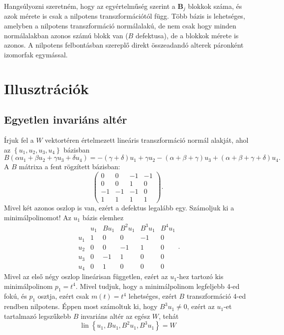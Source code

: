\documentclass[9pt, a4paper, showtrims]{memoir}
\theoremstyle{plain}
\theoremstyle{remark}
\theoremstyle{definition}
\DeclareMathOperator{\lin}{lin}
\begin{document}
Hangsúlyozni szeretném, hogy az egyértelműség szerint a $\mathbf{B}_j$ blokkok száma, és azok mérete is csak
a nilpotens transzformációtól függ.
Több bázis is lehetséges, amelyben a nilpotens transzformáció normálalakú,
de nem csak hogy minden normálalakban azonos számú blokk van ($B$ defektusa),
de a blokkok mérete is azonos.
A nilpotens felbontásban szereplő direkt összeadandó alterek páronként izomorfak egymással.
\section{Illusztrációk}
\subsection{Egyetlen invariáns altér}
Írjuk fel a $W$ vektortéren értelmezett lineáris transzformáció normál alakját,
ahol az $\left\{ u_1,u_2,u_3,u_4 \right\}$ bázisban
\[
	B\left( \alpha u_1+\beta u_2+\gamma u_3+\delta u_4 \right)=
	-\left( \gamma + \delta \right)u_1
	+\gamma u_2
	-\left( \alpha+\beta+\gamma \right)u_3
	+\left( \alpha+\beta+\gamma+\delta \right)u_4.
\]
A $B$ mátrixa a fent rögzített bázisban:
\[
	\begin{pmatrix}
		0  & 0  & -1 & -1 \\
		0  & 0  & 1  & 0  \\
		-1 & -1 & -1 & 0  \\
		1  & 1  & 1  & 1
	\end{pmatrix}.
\]
Mivel két azonos oszlop is van, ezért a defektus legalább egy.
Számoljuk ki a minimálpolinomot!
Az $u_1$ bázis elemhez
\[
	\begin{array}{c|cccccc}
		    & u_1 & Bu_1 & B^2u_1 & B^3u_1 & B^4u_1 \\
		\hline
		u_1 & 1   & 0    & 0      & -1     & 0      \\
		u_2 & 0   & 0    & -1     & 1      & 0      \\
		u_3 & 0   & -1   & 1      & 0      & 0      \\
		u_4 & 0   & 1    & 0      & 0      & 0
	\end{array}.
\]
Mivel az első négy oszlop lineárisan független,
ezért az $u_1$-hez tartozó kis minimálpolinom $p_1=t^4.$
Mivel tudjuk, hogy a minimálpolinom legfeljebb 4-ed fokú, és
$p_1$ osztja, ezért csak $m\left( t \right)=t^4$ lehetséges,
ezért $B$ transzformáció 4-ed rendben nilpotens.
Éppen most számoltuk ki, hogy $B^3u_1\neq 0$, ezért
az $u_1$-et tartalmazó legszűkebb $B$ invariáns altér az egész $W$,
tehát
\[
	\lin\left\{ u_1,Bu_1,B^2u_1,B^3u_1 \right\}=W
\]
\end{document}
